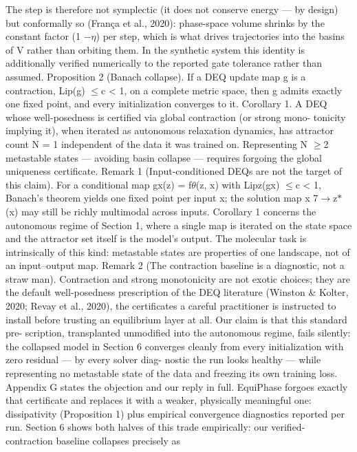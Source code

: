 \documentclass{article}
\begin{document}
The step is therefore not symplectic (it does not conserve energy --- by design) but conformally so
(Fran\c{c}a et al., 2020): phase-space volume shrinks by the constant factor (1 $-$$\eta$) per step, which is
what drives trajectories into the basins of V rather than orbiting them. In the synthetic system this
identity is additionally verified numerically to the reported gate tolerance rather than assumed.
Proposition 2 (Banach collapse). If a DEQ update map g is a contraction, Lip(g) $\le$c < 1, on a
complete metric space, then g admits exactly one fixed point, and every initialization converges to it.
Corollary 1. A DEQ whose well-posedness is certified via global contraction (or strong mono-
tonicity implying it), when iterated as autonomous relaxation dynamics, has attractor count N = 1
independent of the data it was trained on. Representing N $\ge$2 metastable states --- avoiding basin
collapse --- requires forgoing the global uniqueness certificate.
Remark 1 (Input-conditioned DEQs are not the target of this claim). For a conditional map gx(z) =
f$\theta$(z, x) with Lipz(gx) $\le$c < 1, Banach's theorem yields one fixed point per input x; the solution
map x 7$\to$z$*$(x) may still be richly multimodal across inputs. Corollary 1 concerns the autonomous
regime of Section 1, where a single map is iterated on the state space and the attractor set itself is
the model's output. The molecular task is intrinsically of this kind: metastable states are properties
of one landscape, not of an input--output map.
Remark 2 (The contraction baseline is a diagnostic, not a straw man). Contraction and strong
monotonicity are not exotic choices; they are the default well-posedness prescription of the DEQ
literature (Winston \& Kolter, 2020; Revay et al., 2020), the certificates a careful practitioner is
instructed to install before trusting an equilibrium layer at all. Our claim is that this standard pre-
scription, transplanted unmodified into the autonomous regime, fails silently: the collapsed model
in Section 6 converges cleanly from every initialization with zero residual --- by every solver diag-
nostic the run looks healthy --- while representing no metastable state of the data and freezing its
own training loss. Appendix G states the objection and our reply in full.
EquiPhase forgoes exactly that certificate and replaces it with a weaker, physically meaningful one:
dissipativity (Proposition 1) plus empirical convergence diagnostics reported per run. Section 6
shows both halves of this trade empirically: our verified-contraction baseline collapses precisely as
$$
\end{document}
